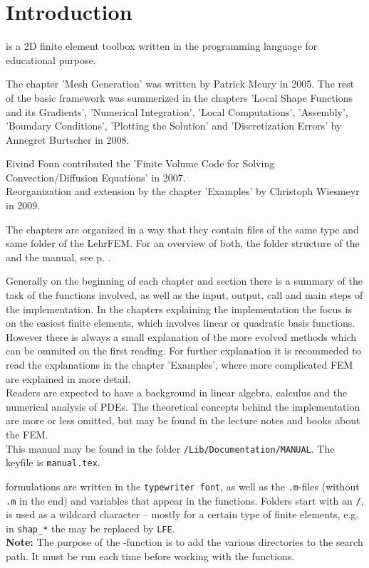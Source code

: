
\chapter*{Introduction}
\label{sect:Intro}

\LIBNAME is a 2D finite element toolbox written in the programming language \MATLAB for educational
purpose. \\

\bigskip

 The chapter 'Mesh Generation' was written by Patrick Meury in 2005. The rest of the basic framework was summerized in the chapters 'Local Shape Functions and its Gradients', 'Numerical Integration', 'Local Computations', 'Assembly', 'Boundary Conditions', 'Plotting the Solution' and 'Discretization Errors' by Annegret Burtscher in 2008.

 Eivind Fonn contributed the 'Finite Volume Code for Solving Convection/Diffusion Equations' in 2007. \\
 
 Reorganization and extension by the chapter 'Examples' by Christoph Wiesmeyr in 2009.

 The chapters are organized in a way that they contain files of the same type and same folder of the LehrFEM. For an overview of both, the folder structure of the \LIBNAME and the manual, see p. \pageref{chap:overview}.

 Generally on the beginning of each chapter and section there is a summary of the task of the functions involved, as well as the input, output, call and main steps of the implementation. In the chapters explaining the implementation the focus is on the easiest finite elements, which involves linear or quadratic basis functions. However there is always a small explanation of the more evolved methods which can be ommited on the first reading. For further explanation it is recommeded to read the explanations in the chapter 'Examples', where more complicated FEM are explained in more detail. \\

 Readers are expected to have a background in linear algebra, calculus and the numerical analysis of PDEs. The theoretical concepts behind the implementation are more or less omitted, but may be found in the lecture notes \cite{HS07} and books about the FEM. \\

 This manual may be found in the folder {\tt /Lib/Documentation/MANUAL}. The keyfile is {\tt manual.tex}.

\bigskip 

 \MATLAB formulations are written in the {\tt typewriter font}, as well as the {\tt .m}-files (without {\tt .m} in the end) and variables that appear in the functions. Folders start with an {\tt /}, {\tt *} is used as a wildcard character -- mostly for a certain type of finite elements, e.g. in {\tt shap\_*} the {\tt *} may be replaced by {\tt LFE}. \\

 \textbf{Note: }The purpose of the -function is to add the various directories to the search path. It must be run each time before working with the \LIBNAME functions.